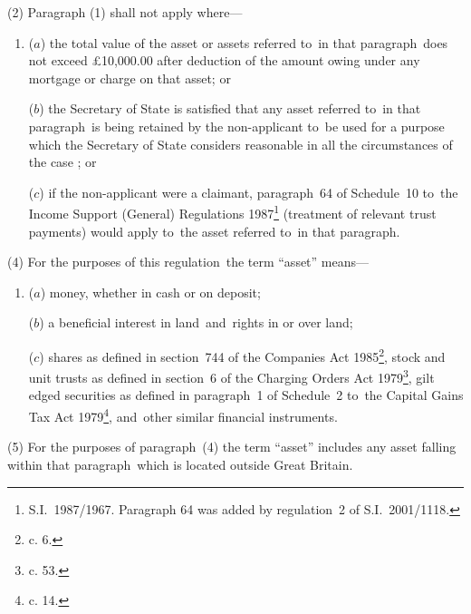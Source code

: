 \documentclass[12pt,a4paper]{article}
\begin{document}
(2) Paragraph (1) shall not apply where—
\begin{enumerate}\item[]
($a$) the total value of the asset or assets referred to~in that paragraph~does not
exceed £10,000.00 after deduction of the amount owing under any mortgage or
charge on that asset; or

($b$) the Secretary of State is satisfied that any asset referred to~in that
paragraph~is being retained by the non-applicant to~be used for a purpose which
the Secretary of State considers reasonable in all the circumstances of the
case%
%
; or

    ($c$) 
    if the non-applicant were a claimant, paragraph~64 of Schedule~10 to~the Income Support (General) Regulations 1987\footnote{S.I.\ 1987/1967. Paragraph 64 was added by regulation~2 of S.I.\ 2001/1118.} (treatment of relevant trust payments) would apply to~the asset referred to~in that paragraph.
\end{enumerate}



(4) For the purposes of this regulation~the term “asset” means—
\begin{enumerate}\item[]
($a$) money, whether in cash or on deposit;

($b$) a beneficial interest in land~and~rights in or over land;

($c$) shares as defined in section~744 of the Companies Act 1985\footnote{ c. 6.}, stock and
unit trusts as defined in section~6 of the Charging Orders Act 1979\footnote{ c. 53.}, gilt
edged securities as defined in paragraph~1 of Schedule~2 to~the Capital Gains
Tax Act 1979\footnote{ c. 14.}, and~other similar financial instruments.
\end{enumerate}

(5) For the purposes of paragraph~(4) the term “asset” includes any asset
falling within that paragraph~which is located outside Great Britain.

\end{document}
